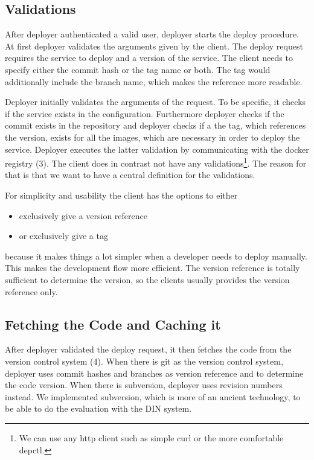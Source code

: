 \subsection{Validations}

After deployer authenticated a valid user, deployer starts the deploy procedure. At first
deployer validates the arguments given by the client. The deploy request requires the
service to deploy and a version of the service. The client needs to specify either the
commit hash or the tag name or both. The tag would additionally include the branch name,
which makes the reference more readable.

Deployer initially validates the arguments of the request. To be specific, it checks if
the service exists in the configuration. Furthermore deployer checks if the commit exists
in the repository and deployer checks if a the tag, which references the version, exists
for all the images, which are necessary in order to deploy the service. Deployer executes
the latter validation by communicating with the docker registry (3). The client does in
contrast not have any validations\footnote{We can use any http client such as simple curl
or the more comfortable depctl.}. The reason for that is that we want to have a central
definition for the validations.

For simplicity and usability the client has the options to either
\begin{itemize}
    \item exclusively give a version reference
    \item or exclusively give a tag
\end{itemize}
because it makes things a lot simpler when a developer needs to deploy
manually. This makes the development flow more efficient. The version reference is totally
sufficient to determine the version, so the clients usually provides the version reference
only.

\subsection{Fetching the Code and Caching it}

After deployer validated the deploy request, it then fetches the code from the version
control system (4). When there is git as the version control system, deployer uses commit
hashes and branches as version reference and to determine the code version. When there is
subversion, deployer uses revision numbers instead. We implemented subversion, which is
more of an ancient technology, to be able to do the evaluation with the DIN system.

